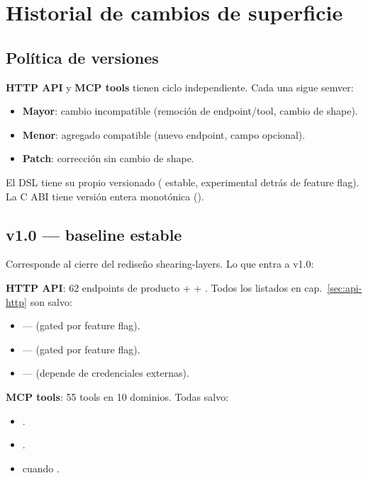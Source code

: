 \chapter{Historial de cambios de superficie}
\label{app:spec-changelog}

\section{Política de versiones}

\textbf{HTTP API} y \textbf{MCP tools} tienen ciclo independiente.
Cada una sigue semver:

\begin{itemize}
    \item \textbf{Mayor}: cambio incompatible (remoción de
    endpoint/tool, cambio de shape).
    \item \textbf{Menor}: agregado compatible (nuevo endpoint, campo
    opcional).
    \item \textbf{Patch}: corrección sin cambio de shape.
\end{itemize}

El DSL tiene su propio versionado ( estable, 
experimental detrás de feature flag). La C ABI tiene versión
entera monotónica ().

\section{v1.0 — baseline estable}

Corresponde al cierre del rediseño shearing-layers. Lo que entra a
v1.0:

\textbf{HTTP API}: 62 endpoints de producto + \code{/} + .
Todos los listados en cap.~\ref{sec:api-http} son 
salvo:

\begin{itemize}
    \item {} — 
    (gated por feature flag).
    \item {} —  (gated por
    feature flag).
    \item {} —  (depende de credenciales
    externas).
\end{itemize}

\textbf{MCP tools}: 55 tools en 10 dominios. Todas 
salvo:

\begin{itemize}
    \item {}.
    \item {}.
    \item {} cuando
    .
\end{itemize}

